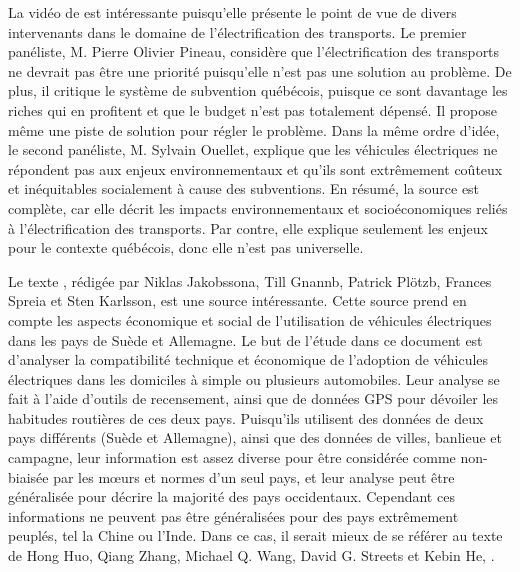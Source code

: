 La vidéo de  est intéressante puisqu’elle présente le point de vue de divers intervenants dans le domaine de l’électrification des transports. Le premier panéliste, M. Pierre Olivier Pineau, considère que l’électrification des transports ne devrait pas être une priorité puisqu’elle n’est pas une solution au problème. De plus, il critique le système de subvention québécois, puisque ce sont davantage les riches qui en profitent et que le budget n’est pas totalement dépensé. Il propose même une piste de solution pour régler le problème. Dans la même ordre d’idée, le second panéliste, M. Sylvain Ouellet, explique que les véhicules électriques ne répondent pas aux enjeux environnementaux et qu’ils sont extrêmement coûteux et inéquitables socialement à cause des subventions. En résumé, la source est complète, car elle décrit les impacts environnementaux et socioéconomiques reliés à l’électrification des transports. Par contre, elle explique seulement les enjeux pour le contexte québécois, donc elle n’est pas universelle.

Le texte , rédigée par Niklas Jakobssona, Till Gnannb, Patrick Plötzb, Frances Spreia et Sten Karlsson, est une source intéressante. Cette source prend en compte les aspects économique et social de l'utilisation de véhicules électriques dans les pays de Suède et Allemagne. Le but de l'étude dans ce document est d'analyser la compatibilité technique et économique de l'adoption de véhicules électriques dans les domiciles à simple ou plusieurs automobiles. Leur analyse se fait à l'aide d'outils de recensement, ainsi que de données GPS pour dévoiler les habitudes routières de ces deux pays. Puisqu'ils utilisent des données de deux pays différents (Suède et Allemagne), ainsi que des données de villes, banlieue et campagne, leur information est assez diverse pour être considérée comme non-biaisée par les m\oe urs et normes d'un seul pays, et leur analyse peut être généralisée pour décrire la majorité des pays occidentaux. Cependant ces informations ne peuvent pas être généralisées pour des pays extrêmement peuplés, tel la Chine ou l'Inde. Dans ce cas, il serait mieux de se référer au texte de Hong Huo, Qiang Zhang, Michael Q. Wang, David G. Streets et Kebin He, .

